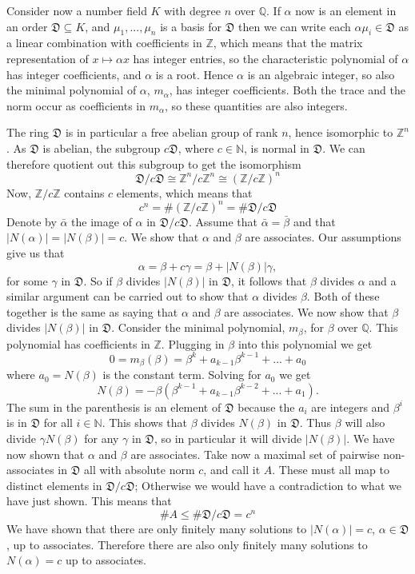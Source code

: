 \documentclass{article}
\newcommand{\mfrak}[1]{\mathfrak{#1}}
\newcommand{\mbb}[1]{\mathbb{#1}}
\begin{document}
Consider now a number field $K$ with degree $n$ over $\mbb{Q}$. If $\alpha$ now is an element in an order $\mfrak D \subseteq K$, and $\mu_1, ..., \mu_n$ is a basis for $\mfrak D$ then we can write each $\alpha \mu_i \in \mfrak D$ as a linear combination with coefficients in $\mbb Z$, which means that the matrix representation of $x \mapsto \alpha x$ has integer entries, so the characteristic polynomial of $\alpha$ has integer coefficients, and $\alpha$ is a root. Hence $\alpha$ is an algebraic integer, so also the minimal polynomial of $\alpha$, $m_\alpha$, has integer coefficients. Both the trace and the norm occur as coefficients in $m_\alpha$, so these quantities are also integers. 

The ring $\mfrak D$ is in particular a free abelian group of rank $n$, hence isomorphic to $\mbb Z^n$. As $\mfrak D$ is abelian, the subgroup $c \mfrak D$, where $c \in \mbb N$, is normal in $\mfrak D$. We can therefore quotient out this subgroup to get the isomorphism
$$\mfrak D/c \mfrak D \cong \mbb Z^n/c \mbb Z^n \cong (\mbb Z/c \mbb Z)^n$$
Now, $\mbb Z / c \mbb Z$ contains $c$ elements, which means that 
$$c^n = \# (\mbb Z/c \mbb Z)^n = \# \mfrak D/c \mfrak D$$
Denote by $\bar \alpha$ the image of $\alpha$ in $\mfrak D/c \mfrak D$. Assume that $\bar \alpha = \bar \beta$ and that $|N(\alpha)| = |N(\beta)| = c$. We show that $\alpha$ and $\beta$ are associates. Our assumptions give us that
$$\alpha = \beta + c \gamma = \beta + |N(\beta)| \gamma,$$
for some $\gamma$ in $\mfrak D$. So if $\beta$ divides $|N(\beta)|$ in $\mfrak D$, it follows that $\beta$ divides $\alpha$ and a similar argument can be carried out to show that $\alpha$ divides $\beta$. Both of these together is the same as saying that $\alpha$ and $\beta$ are associates. We now show that $\beta$ divides $|N(\beta)|$ in $\mfrak D$. Consider the minimal polynomial, $m_\beta$, for $\beta$ over $\mbb Q$. This polynomial has coefficients in $\mbb Z$. Plugging in $\beta$ into this polynomial we get
$$0 = m_\beta(\beta) = \beta^k + a_{k-1}\beta^{k-1} + ... + a_0$$
where $a_0 = N(\beta)$ is the constant term. Solving for $a_0$ we get
$$N(\beta) = -\beta(\beta^{k-1} + a_{k-1}\beta^{k-2} + ... + a_1).$$
The sum in the parenthesis is an element of $\mfrak D$ because the $a_i$ are integers and $\beta^i$ is in $\mfrak D$ for all $i \in \mbb N$. This shows that $\beta$ divides $N(\beta)$ in $\mfrak D$. Thus $\beta$ will also divide $\gamma N(\beta)$ for any $\gamma$ in $\mfrak D$, so in particular it will divide $|N(\beta)|$. We have now shown that $\alpha$ and $\beta$ are associates. 
Take now a maximal set of pairwise non-associates in $\mfrak D$ all with absolute norm $c$, and call it $A$. These must all map to distinct elements in $\mfrak D/c \mfrak D$; Otherwise we would have a contradiction to what we have just shown. This means that $$\# A \leq \# \mfrak D / c \mfrak D = c^n$$ 
We have shown that there are only finitely many solutions to $|N(\alpha)| = c$, $\alpha \in \mfrak D$, up to associates. Therefore there are also only finitely many solutions to $N(\alpha) = c$ up to associates.
\end{document}

